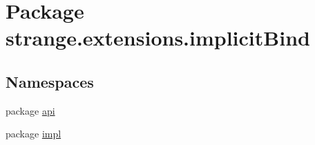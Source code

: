 \hypertarget{namespacestrange_1_1extensions_1_1implicit_bind}{\section{Package strange.\-extensions.\-implicit\-Bind}
\label{namespacestrange_1_1extensions_1_1implicit_bind}
}
\subsection*{Namespaces}
\begin{DoxyCompactItemize}
\item 
package \hyperlink{namespacestrange_1_1extensions_1_1implicit_bind_1_1api}{api}
\item 
package \hyperlink{namespacestrange_1_1extensions_1_1implicit_bind_1_1impl}{impl}
\end{DoxyCompactItemize}
